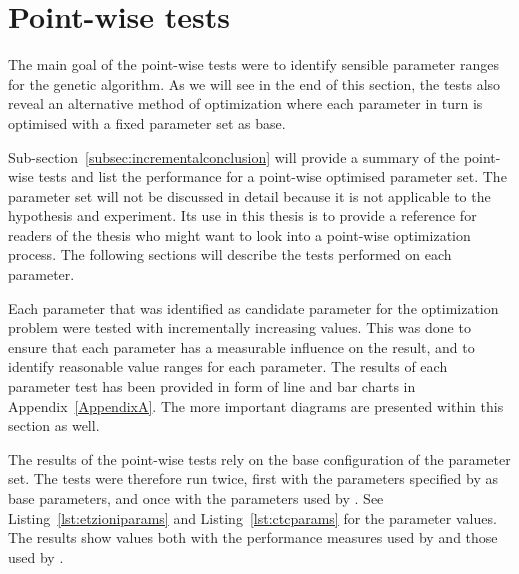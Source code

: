 

\section{Point-wise tests}

The main goal of the point-wise tests were to identify sensible parameter ranges for the genetic algorithm. As we will see in the end of this section, the tests also reveal an alternative method of optimization where each parameter in turn is optimised with a fixed parameter set as base.

Sub-section~\ref{subsec:incrementalconclusion} will provide a summary of the point-wise tests and list the performance for a point-wise optimised parameter set. The parameter set will not be discussed in detail because it is not applicable to the hypothesis and experiment. Its use in this thesis is to provide a reference for readers of the thesis who might want to look into a point-wise optimization process. The following sections will describe the tests performed on each parameter.

Each parameter that was identified as candidate parameter for the optimization problem were tested with incrementally increasing values. This was done to ensure that each parameter has a measurable influence on the result, and to identify reasonable value ranges for each parameter. The results of each parameter test has been provided in form of line and bar charts in Appendix~\ref{AppendixA}. The more important diagrams are presented within this section as well.

The results of the point-wise tests rely on the base configuration of the parameter set. The tests were therefore run twice,  first with the parameters specified by \citeauthor{Oren1998} as base parameters, and once with the parameters used by \cite{Moe2014compact}. See Listing~\ref{lst:etzioniparams} and Listing~\ref{lst:ctcparams} for the parameter values. The results show values both with the performance measures used by \citeauthor{Moe2014compact} and those used by \citeauthor{Oren1998}.

